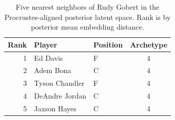 \begin{table}[htbp]
  \centering\small
  \begin{tabular}{rllc}
    \toprule
    Rank & Player & Position & Archetype \\
    \midrule
    1 & Ed Davis & F & 4 \\
    2 & Adem Bona & C & 4 \\
    3 & Tyson Chandler & F & 4 \\
    4 & DeAndre Jordan & C & 4 \\
    5 & Jaxson Hayes & C & 4 \\
    \bottomrule
  \end{tabular}
  \caption{Five nearest neighbors of Rudy Gobert in the Procrustes-aligned posterior latent space. Rank is by posterior mean embedding distance.}
  \label{tab:Rudy_Gobert_neighbors}
\end{table}

